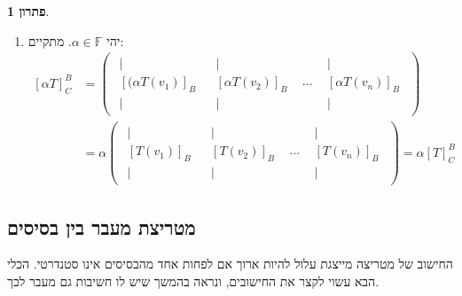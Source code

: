 \documentclass[12pt]{report}
\theoremstyle{plain}
\theoremstyle{definition}
\newtheorem*{solution}{פתרון}
\newcommand{\F}{\mathbb{F}}
\newcommand{\0}{\mathbf{0}}
\begin{document}
\begin{solution}
\begin{enumerate}[label=\alph*.]
\item
יהי
$\alpha\in\F$.
מתקיים:
$$
\begin{aligned}
[\alpha T]_C^B&=\begin{pmatrix}
\begin{array}{c}
|\\[-0.4ex]
[(\alpha T(v_1)]_B\\[-0.4ex]
|
\end{array}
&
\begin{array}{c}
|\\[-0.4ex]
[\alpha T(v_2)]_B\\[-0.4ex]
|
\end{array}
&
\cdots
&
\begin{array}{c}
|\\[-0.4ex]
[\alpha T(v_n)]_B\\[-0.4ex]
|
\end{array}
\end{pmatrix} \\
&=\alpha\begin{pmatrix}
\begin{array}{c}
|\\[-0.4ex]
[T(v_1)]_B\\[-0.4ex]
|
\end{array}
&
\begin{array}{c}
|\\[-0.4ex]
[T(v_2)]_B\\[-0.4ex]
|
\end{array}
&
\cdots
&
\begin{array}{c}
|\\[-0.4ex]
[T(v_n)]_B\\[-0.4ex]
|
\end{array}
\end{pmatrix}=\alpha [T]_C^B
\end{aligned}
$$


\end{enumerate}
\end{solution}
\subsection{מטריצת מעבר בין בסיסים}

החישוב של מטריצה מייצגת עלול להיות ארוך אם לפחות אחד מהבסיסים אינו סטנדרטי. הכלי הבא עשוי לקצר את החישובים, ונראה בהמשך שיש לו חשיבות גם מעבר לכך.
\end{document}

